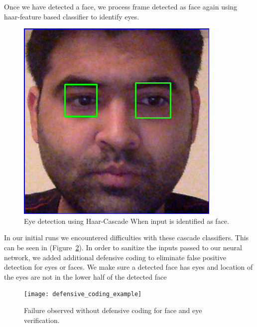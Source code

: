 \documentclass[10pt,twocolumn,letterpaper]{article}
\begin{document}
Once we have detected a face, we process frame detected 
as face again using haar-feature based classifier to identify eyes. 

\begin{figure}
  \begin{center}
    \includegraphics[width=\linewidth]{eyes_detected}
  \end{center}
  \caption{Eye detection using Haar-Cascade When input is identified as face.}
  \label{fig:eyes_detected}
\end{figure}

In our initial runs we encountered difficulties with these cascade classifiers.
This can be seen in  (Figure~\ref{fig:defensive}).
In order to sanitize the inputs passed to our neural network, we added 
additional defensive coding to eliminate false positive detection 
for eyes or faces. We make sure a detected face has eyes 
and location of the eyes are not in the lower half of the detected face

\begin{figure}
  \begin{center}
    \texttt{[image: defensive\_coding\_example]}
  \end{center}
  \caption{Failure observed without defensive coding for face and eye
    verification.}
  \label{fig:defensive}
\end{figure}
\end{document}
